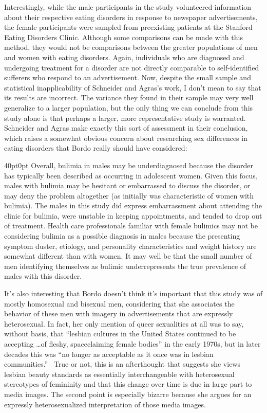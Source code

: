 \documentclass[11pt]{article}
\begin{document}
    Interestingly, while the male participants in the study volunteered information about their respective eating disorders in response to newspaper advertisements, the female participants were sampled from preexisting patients at the Stanford Eating Disorders Clinic. Although some comparisons can be made with this method, they would not be comparisons between the greater populations of men and women with eating disorders. Again, individuals who are diagnosed and undergoing treatment for a disorder are not directly comparable to self-identified sufferers who respond to an advertisement. Now, despite the small sample and statistical inapplicability of Schneider and Agras's work, I don't mean to say that its results are incorrect. The variance they found in their sample may very well generalize to a larger population, but the only thing we can conclude from this study alone is that perhaps a larger, more representative study is warranted. Schneider and Agras make exactly this sort of assessment in their conclusion, which raises a somewhat obvious concern about researching sex differences in eating disorders that Bordo really should have considered:
    \begin{adjustwidth}{40pt}{0pt}
        Overall, bulimia in males may be underdiagnosed because the disorder has typically been described as occurring in adolescent women. Given this focus, males with bulimia may be hesitant or embarrassed to discuss the disorder, or may deny the problem altogether (as initially was characteristic of women with bulimia). The males in this study did express embarrassment about attending the clinic for bulimia, were unstable in keeping appointments, and tended to drop out of treatment. Health care professionals familiar with female bulimics may not be considering bulimia as a possible diagnosis in males because the presenting symptom duster, etiology, and personality characteristics and weight history are somewhat different than with women. It may well be that the small number of men identifying themselves as bulimic underrepresents the true prevalence of males with this disorder.~\autocite[238, 241]{Schneider87}
    \end{adjustwidth}
    It's also interesting that Bordo doesn't think it's important that this study was of mostly homosexual and bisexual men, considering that she associates the behavior of these men with imagery in advertisements that are expressly heterosexual. In fact, her only mention of queer sexualities at all was to say, without basis, that ``lesbian cultures in the United States continued to be accepting \dots of fleshy, spaceclaiming female bodies'' in the early 1970s, but in later decades this was ``no longer as acceptable as it once was in lesbian communities.''~\autocite[103]{Bordo03} True or not, this is an afterthought that suggests she views lesbian beauty standards as essentially interchangeable with heterosexual stereotypes of femininity and that this change over time is due in large part to media images. The second point is especially bizarre because she argues for an expressly heterosexualized interpretation of those media images.
\end{document}
